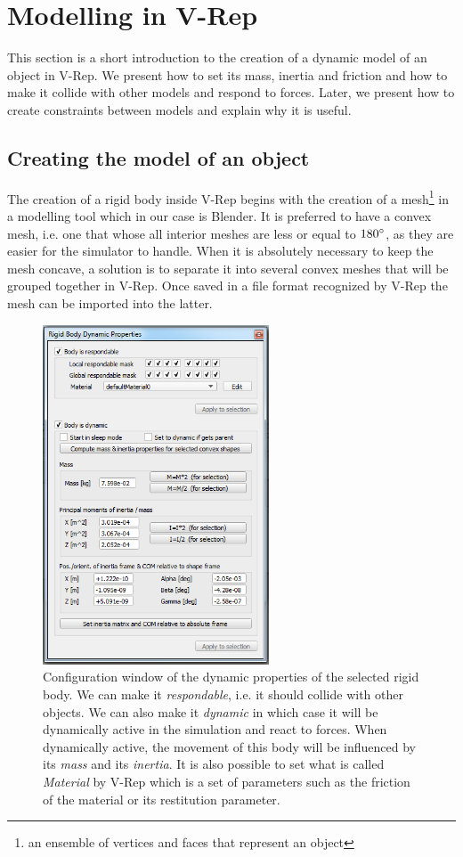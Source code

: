 \section{Modelling in V-Rep \label{sec:modelling}}
This section is a short introduction to the creation of a dynamic model of an object in V-Rep. We present how to set its mass, inertia and friction and how to make it collide with other models and respond to forces. Later, we present how to create constraints between models and explain why it is useful.

\subsection{Creating the model of an object}
The creation of a rigid body inside V-Rep begins with the creation of a mesh\footnote{an ensemble of vertices and faces that represent an object} in a modelling tool which in our case is Blender. It is preferred to have a convex mesh, i.e. one that whose all interior meshes are less or equal to $180\degree$, as they are easier for the simulator to handle. When it is absolutely necessary to keep the mesh concave, a solution is to separate it into several convex meshes that will be grouped together in V-Rep. Once saved in a file format recognized by V-Rep the mesh can be imported into the latter. 

\begin{figure}[htp]
\center
    \includegraphics[width = 0.6\textwidth]{figures/v-rep_modelling}
    \caption[Rigid body dynamic properties]{Configuration window of the dynamic properties of the selected rigid body. We can make it \emph{respondable}, i.e. it should collide with other objects. We can also make it \emph{dynamic} in which case it will be dynamically active in the simulation and react to forces. When dynamically active, the movement of this body will be influenced by its \emph{mass} and its \emph{inertia}. It is also possible to set what is called \emph{Material} by V-Rep which is a set of parameters such as the friction of the material or its restitution parameter.}
    \label{fig:vrep_modelling}
\end{figure}

